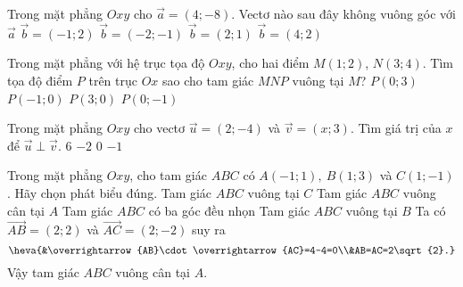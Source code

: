 \begin{ex}%
	Trong mặt phẳng $Oxy$ cho $\overrightarrow{a}=(4;-8).$ Vectơ nào sau đây không vuông góc với $\overrightarrow{a}$
	\choice
	{\True $\overrightarrow{b}=(-1;2)$}
	{$\overrightarrow{b}=(-2;-1)$}
	{$\overrightarrow{b}=(2;1)$}
	{$\overrightarrow{b}=(4;2)$}
\end{ex}

\begin{ex}%
	Trong mặt phẳng với hệ trục tọa độ $Oxy$, cho hai điểm $M(1;2)$, $N(3;4)$. Tìm tọa độ điểm $P$ trên
	trục $Ox$ sao cho tam giác $MNP$ vuông tại $M$?
	\choice
	{$P(0;3)$}
	{$P(-1;0)$}
	{\True $P(3;0)$}
	{$P(0;-1)$}
\end{ex}

\begin{ex}%
	Trong mặt phẳng $Oxy$ cho vectơ $\overrightarrow{u}=(2;-4)$ và $\overrightarrow{v}=(x;3)$. Tìm giá trị của $x$ để $\overrightarrow{u}\perp \overrightarrow{v}$.
	\choice
	{\True $6$}
	{$-2$}
	{$0$}
	{$-1$}
\end{ex}

\begin{ex}%
	Trong mặt phẳng $Oxy$, cho tam giác $ABC$ có $A(-1;1),~B(1;3)$ và $C(1;-1)$. Hãy chọn phát biểu đúng.
	\choice
	{Tam giác $ABC$ vuông tại $C$}
	{\True Tam giác $ABC$ vuông cân tại $A$}
	{Tam giác $ABC$ có ba góc đều nhọn}
	{Tam giác $ABC$ vuông tại $B$}
	\loigiai
	{
		Ta có $\overrightarrow{AB}=(2;2)$ và $\overrightarrow{AC}=(2;-2)$ suy ra
		\[\heva{&\overrightarrow{AB}\cdot\overrightarrow{AC}=4-4=0\\&AB=AC=2\sqrt{2}.}\]
		Vậy tam giác $ABC$ vuông cân tại $A$.
	}
\end{ex}

